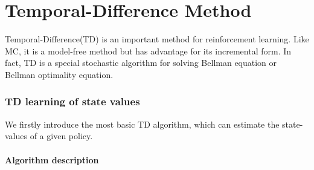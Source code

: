 \part{Temporal-Difference Method} Temporal-Difference(TD) is an important method for reinforcement learning. Like MC, it is a model-free method but has
advantage for its incremental form. In fact, TD is a special stochastic algorithm for solving Bellman equation or Bellman optimality equation.

\section{TD learning of state values}

  We firstly introduce the most basic TD algorithm, which can estimate the state-values of a given policy.

  \subsection{Algorithm description}


